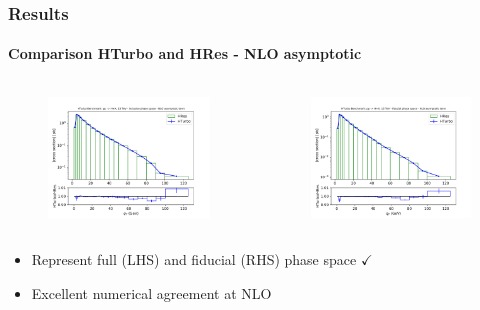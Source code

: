 \documentclass[aspectratio=43]{beamer}
\begin{document}
\begin{frame}

\frametitle{Results}
\framesubtitle{Comparison HTurbo and HRes - NLO asymptotic}

	\begin{columns}
		
		
		\begin{figure}
			\includegraphics[width = 7cm]{plots/part3/chapter6/nnlo-ct-1.png}
		\end{figure}
		
		
		\begin{figure}
			\includegraphics[width = 7cm]{plots/part3/chapter6/nnlo-ct-fid-1.png}
		\end{figure}
		
	\end{columns}
	
	\begin{itemize}
		\item \footnotesize Represent full (LHS) and fiducial (RHS) phase space {\color{darkgreen}$\checkmark$} 
		\item \footnotesize Excellent numerical agreement at NLO
	\end{itemize}

\end{frame}
\end{document}
